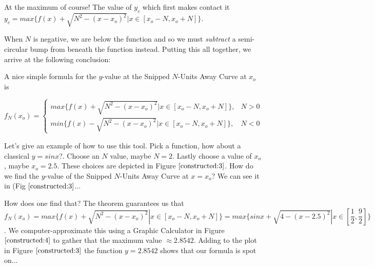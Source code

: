 At the maximum of course! The value of $y_c$ which first makes contact it $y_c = max \{ f(x) + \sqrt{ N^2 - (x - x_o)^2 } | x \in [ x_o - N, x_o + N] \}$.

When $N$ is negative, we are below the function and so we must \textit{subtract} a semi-circular bump from beneath the function instead. Putting this all together, we arrive at the following conclusion:

\begin{theorem}

  A nice simple formula for the $y$-value at the Snipped $N$-Units Away Curve at $x_o$ is
  \begin{center}
    $
    f_N(x_o) =
    \begin{cases}
      max \{ f(x) + \sqrt{ N^2 - (x - x_o)^2 } | x \in [ x_o - N, x_o + N] \}, &
      N > 0 \\
      min \{ f(x) - \sqrt{ N^2 - (x - x_o)^2 } | x \in [ x_o - N, x_o + N] \}, &
      N < 0
    \end{cases}
    $
  \end{center}

\end{theorem}

Let's give an example of how to use this tool. Pick a function, how about a classical $y = sin x$?. Choose an $N$ value, maybe $N = 2$. Lastly choose a value of $x_o$, maybe $x_o = 2.5$. These choices are depicted in Figure $\ref{constructed:3}$. How do we find the $y$-value of the Snipped $N$-Units Away Curve at $x = x_o$? We can see it in (Fig $\ref{constructed:3}$...

How does one find that? The theorem guarantees us that $f_N(x_o) = max \{ f(x) + \sqrt{ N^2 - (x - x_o)^2 } | x \in [ x_o - N, x_o + N ] \} = max \{ sin x + \sqrt{ 4 - (x - 2.5)^2 } | x \in [ \dfrac{1}{2}, \dfrac{9}{2} ] \}$. We computer-approximate this using a Graphic Calculator in Figure $\ref{constructed:4}$ to gather that the maximum value $\approx 2.8542$. Adding to the plot in Figure $\ref{constructed:3}$ the function $y = 2.8542$ shows that our formula is spot on...

\renewcommand\w{0.3\linewidth}
\renewcommand\fw{0.9\textwidth}


